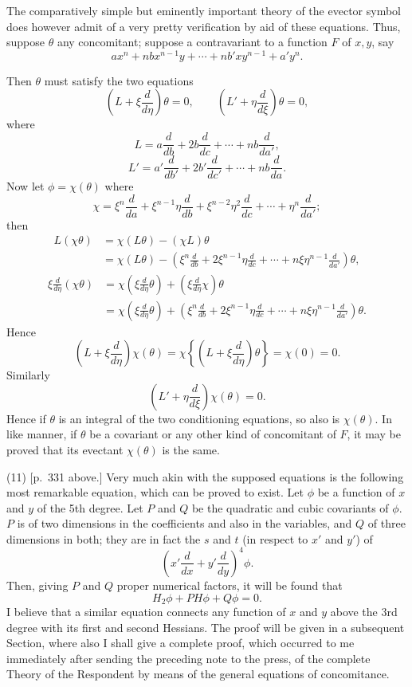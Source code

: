 \documentclass[11pt]{article}
\newcommand{\sourcepage}[1]{\marginpar{\scriptsize p.~#1}}
\begin{document}
{{The comparatively simple but eminently important theory of the evector symbol does however admit of a very pretty verification by aid of these equations. Thus, suppose $\theta$ any concomitant; suppose a contravariant to a function $F$ of $x,y$, say
\[
ax^n+nbx^{n-1}y+\cdots+nb'xy^{n-1}+a'y^n.
\]

\sourcepage{362}
Then $\theta$ must satisfy the two equations
\[
\left(L+\xi\frac{d}{d\eta}\right)\theta=0,
\qquad
\left(L'+\eta\frac{d}{d\xi}\right)\theta=0,
\]
where
\[
L=a\frac{d}{db}+2b\frac{d}{dc}+\cdots+nb\frac{d}{da'},
\]
\[
L'=a'\frac{d}{db'}+2b'\frac{d}{dc'}+\cdots+nb\frac{d}{da}.
\]
Now let $\phi=\chi(\theta)$ where
\[
\chi=\xi^n\frac{d}{da}+\xi^{n-1}\eta\frac{d}{db}+\xi^{n-2}\eta^2\frac{d}{dc}+\cdots+\eta^n\frac{d}{da'};
\]
then
\[
\begin{aligned}
L(\chi\theta)&=\chi(L\theta)-(\chi L)\theta\\
&=\chi(L\theta)-\left(\xi^n\frac{d}{db}+2\xi^{n-1}\eta\frac{d}{dc}+\cdots+n\xi\eta^{n-1}\frac{d}{da'}\right)\theta,
\end{aligned}
\]
\[
\begin{aligned}
\xi\frac{d}{d\eta}(\chi\theta)&=\chi\left(\xi\frac{d}{d\eta}\theta\right)+\left(\xi\frac{d}{d\eta}\chi\right)\theta\\
&=\chi\left(\xi\frac{d}{d\eta}\theta\right)+
\left(\xi^n\frac{d}{db}+2\xi^{n-1}\eta\frac{d}{dc}+\cdots+n\xi\eta^{n-1}\frac{d}{da'}\right)\theta.
\end{aligned}
\]
Hence
\[
\left(L+\xi\frac{d}{d\eta}\right)\chi(\theta)=
\chi\left\{\left(L+\xi\frac{d}{d\eta}\right)\theta\right\}=\chi(0)=0.
\]
Similarly
\[
\left(L'+\eta\frac{d}{d\xi}\right)\chi(\theta)=0.
\]
Hence if $\theta$ is an integral of the two conditioning equations, so also is $\chi(\theta)$. In like manner, if $\theta$ be a covariant or any other kind of concomitant of $F$, it may be proved that its evectant $\chi(\theta)$ is the same.

(11) [p.~331 above.] Very much akin with the supposed equations is the following most remarkable equation, which can be proved to exist. Let $\phi$ be a function of $x$ and $y$ of the 5th degree. Let $P$ and $Q$ be the quadratic and cubic covariants of $\phi$. $P$ is of two dimensions in the coefficients and also in the variables, and $Q$ of three dimensions in both; they are in fact the $s$ and $t$ (in respect to $x'$ and $y'$) of
\[
\left(x'\frac{d}{dx}+y'\frac{d}{dy}\right)^4\phi.
\]
Then, giving $P$ and $Q$ proper numerical factors, it will be found that
\[
H_2\phi+PH\phi+Q\phi=0.
\]
I believe that a similar equation connects any function of $x$ and $y$ above the 3rd degree with its first and second Hessians. The proof will be given in a subsequent Section, where also I shall give a complete proof, which occurred to me immediately after sending the preceding note to the press, of the complete Theory of the Respondent by means of the general equations of concomitance.

}}
\end{document}
